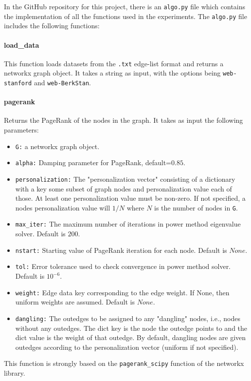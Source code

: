 \noindent In the GitHub repository for this project, there is an \texttt{algo.py} file which contains the implementation of all the functions used in the experiments. The \texttt{algo.py} file includes the following functions:

\paragraph{load\_data} This function loads datasets from the \texttt{.txt} edge-list format and returns a networkx graph object. It takes a string as input, with the options being \texttt{web-stanford} and \texttt{web-BerkStan}.

\paragraph{pagerank} Returns the PageRank of the nodes in the graph. It takes as input the following parameters:
    \begin{itemize}
        \item \texttt{G:} a networkx graph object.
        \item \texttt{alpha:} Damping parameter for PageRank, default=$0.85$.
        \item \texttt{personalization:} The "personalization vector" consisting of a dictionary with a key some subset of graph nodes and personalization value each of those. At least one personalization value must be non-zero. If not specified, a nodes personalization value will $1/N$ where $N$ is the number of nodes in \texttt{G}.
        \item \texttt{max\_iter:} The maximum number of iterations in power method eigenvalue solver. Default is $200$.
        \item \texttt{nstart:} Starting value of PageRank iteration for each node. Default is $None$.
        \item \texttt{tol:} Error tolerance used to check convergence in power method solver. Default is $10^{-6}$.
        \item \texttt{weight:} Edge data key corresponding to the edge weight. If None, then uniform weights are assumed. Default is $None$.
        \item \texttt{dangling:} The outedges to be assigned to any "dangling" nodes, i.e., nodes without any outedges. The dict key is the node the outedge points to and the dict value is the weight of that outedge. By default, dangling nodes are given outedges according to the personalization vector (uniform if not specified).
    \end{itemize}
This function is strongly based on the \texttt{pagerank\_scipy} function of the networkx library.

